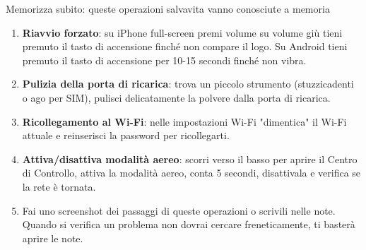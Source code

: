 \begin{tcbpractice}{Memorizza subito: queste operazioni salvavita vanno conosciute a memoria}
\begin{enumerate}
  \item \textbf{Riavvio forzato}: su iPhone full-screen premi volume su volume giù tieni premuto il tasto di accensione finché non compare il logo. Su Android tieni premuto il tasto di accensione per 10-15 secondi finché non vibra.
  \item \textbf{Pulizia della porta di ricarica}: trova un piccolo strumento (stuzzicadenti o ago per SIM), pulisci delicatamente la polvere dalla porta di ricarica.
  \item \textbf{Ricollegamento al Wi-Fi}: nelle impostazioni Wi-Fi "dimentica" il Wi-Fi attuale e reinserisci la password per ricollegarti.
  \item \textbf{Attiva/disattiva modalità aereo}: scorri verso il basso per aprire il Centro di Controllo, attiva la modalità aereo, conta 5 secondi, disattivala e verifica se la rete è tornata.
  \item Fai uno screenshot dei passaggi di queste operazioni o scrivili nelle note. Quando si verifica un problema non dovrai cercare freneticamente, ti basterà aprire le note.
\end{enumerate}

\end{tcbpractice}
